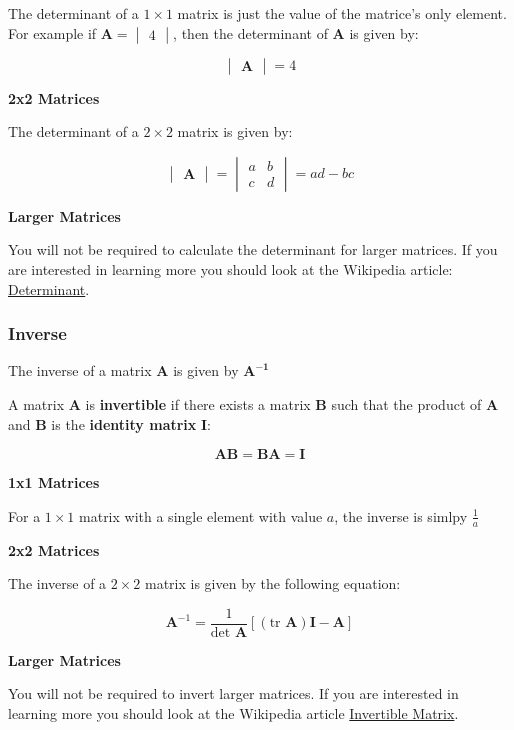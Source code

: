 \documentclass[11pt]{article}
\begin{document}
The determinant of a \(1\times1\) matrix is just the value of the
matrice's only element. For example if
\(\mathbf{A} = \begin{vmatrix}4\end{vmatrix}\), then the determinant of
\(\mathbf{A}\) is given by:

\[\begin{vmatrix}\mathbf{A}\end{vmatrix} = 4\]

\textbf{2x2 Matrices}

The determinant of a \(2\times2\) matrix is given by:

\[\begin{vmatrix}\mathbf{A}\end{vmatrix} = \begin{vmatrix}
a & b \\
c & d \end{vmatrix} = ad - bc
\]

\textbf{Larger Matrices}

You will not be required to calculate the determinant for larger
matrices. If you are interested in learning more you should look at the
Wikipedia article:
\href{https://en.wikipedia.org/wiki/Determinant}{Determinant}.

\hypertarget{inverse}{%
\subsubsection{Inverse}\label{inverse}}

The inverse of a matrix \(\mathbf{A}\) is given by \(\mathbf{A^{-1}}\)

A matrix \(\mathbf{A}\) is \textbf{invertible} if there exists a matrix
\(\mathbf{B}\) such that the product of \(\mathbf{A}\) and
\(\mathbf{B}\) is the \textbf{identity matrix} \(\mathbf{I}\):

\[\mathbf{AB} = \mathbf{BA} = \mathbf{I}\]

\textbf{1x1 Matrices}

For a \(1\times1\) matrix with a single element with value \(a\), the
inverse is simlpy \(\frac{1}{a}\)

\textbf{2x2 Matrices}

The inverse of a \(2\times 2\) matrix is given by the following
equation:

\[\mathbf{A}^{-1} = \frac{1}{\text{det }\mathbf{A}} \left[\left(\text{tr } \mathbf{A}\right) \mathbf{I} - \mathbf{A}\right]\]

\textbf{Larger Matrices}

You will not be required to invert larger matrices. If you are
interested in learning more you should look at the Wikipedia article
\href{https://en.wikipedia.org/wiki/Invertible_matrix}{Invertible
Matrix}.


    
    
    
    
\end{document}
